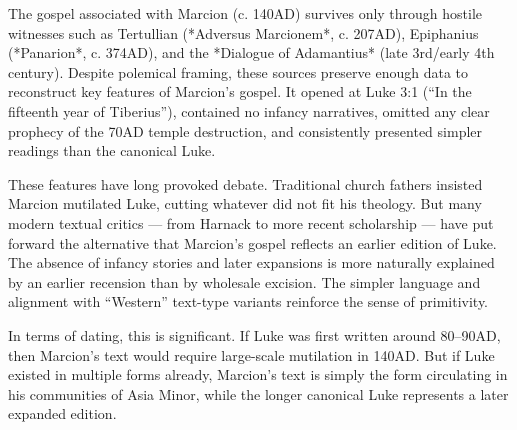 The gospel associated with Marcion (c. 140AD) survives only through hostile witnesses such as Tertullian (*Adversus Marcionem*, c. 207AD), Epiphanius (*Panarion*, c. 374AD), and the *Dialogue of Adamantius* (late 3rd/early 4th century).
Despite polemical framing, these sources preserve enough data to reconstruct key features of Marcion’s gospel.
It opened at Luke 3:1 (“In the fifteenth year of Tiberius”), contained no infancy narratives, omitted any clear prophecy of the 70AD temple destruction, and consistently presented simpler readings than the canonical Luke.

These features have long provoked debate.
Traditional church fathers insisted Marcion mutilated Luke, cutting whatever did not fit his theology.
But many modern textual critics — from Harnack to more recent scholarship — have put forward the alternative that Marcion’s gospel reflects an earlier edition of Luke.
The absence of infancy stories and later expansions is more naturally explained by an earlier recension than by wholesale excision.
The simpler language and alignment with “Western” text-type variants reinforce the sense of primitivity.

In terms of dating, this is significant.
If Luke was first written around 80–90AD, then Marcion’s text would require large-scale mutilation in 140AD.
But if Luke existed in multiple forms already, Marcion’s text is simply the form circulating in his communities of Asia Minor, while the longer canonical Luke represents a later expanded edition.

